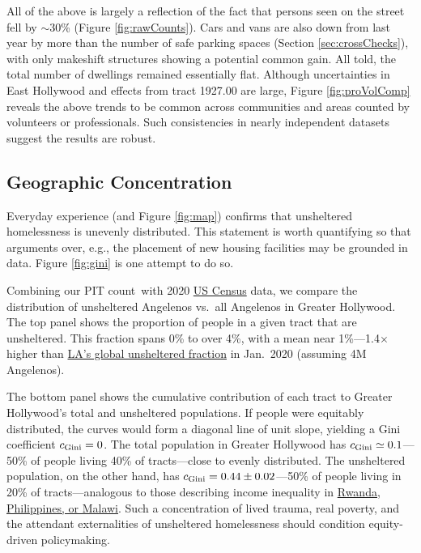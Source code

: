 \documentclass[11pt,twocolumn]{article}
\def\Count{count}
\begin{document}
All of the above is largely a reflection of the fact that persons seen on the street fell by $\sim$30\%
(Figure \ref{fig:rawCounts}). Cars and vans are also down from last year by more than the number of 
safe parking spaces (Section \ref{sec:crossChecks}), with only makeshift structures showing a potential 
common gain. All told, the total number of dwellings remained essentially flat. Although uncertainties 
in East Hollywood and effects from tract 1927.00 are large, Figure \ref{fig:proVolComp} reveals the above 
trends to be common across communities and areas counted by volunteers or professionals. Such consistencies 
in nearly independent datasets suggest the results are robust. 


\subsection{Geographic Concentration}
\label{sec:concentration}

Everyday experience (and Figure \ref{fig:map}) confirms that unsheltered homelessness is
unevenly distributed. This statement is worth quantifying so that arguments over, e.g., the 
placement of new housing facilities may be grounded in data. Figure \ref{fig:gini} is one attempt to 
do so. 

Combining our PIT \Count\ with 2020 \href{https://geomap.ffiec.gov/FFIECGeocMap/GeocodeMap1.aspx}
{US Census} data, we compare the distribution of unsheltered Angelenos vs.\ all Angelenos in Greater
Hollywood. The top panel shows the proportion of people in a given tract that are unsheltered. This fraction 
spans 0\% to over 4\%, with a mean near 1\%---1.4$\times$ higher than 
\href{https://www.lahsa.org/documents?id=4680-2020-greater-los-angeles-homeless-count-city-of-los-angeles}
{LA's global unsheltered fraction} in Jan.~2020 (assuming 4M Angelenos).

The bottom panel shows the cumulative contribution of each tract to Greater Hollywood's
total and unsheltered populations. If people were equitably distributed, the curves would 
form a diagonal line of unit slope, yielding a Gini coefficient $c_{\rm Gini}=0$. 
The total population in Greater Hollywood has $c_{\rm Gini}\simeq0.1$---50\% of people 
living 40\% of tracts---close to evenly distributed. The unsheltered population, 
on the other hand, has $c_{\rm Gini}=0.44\pm0.02$---50\% of people living in 20\% of 
tracts---analogous to those describing income inequality in 
\href{https://en.wikipedia.org/wiki/List_of_countries_by_income_equality#UN,_World_Bank_and_CIA_list_\%E2\%80\%93_income_ratios_and_Gini_indices}{Rwanda, Philippines, or Malawi}. Such a concentration 
of lived trauma, real poverty, and the attendant externalities of unsheltered homelessness 
should condition equity-driven policymaking.
\end{document}
